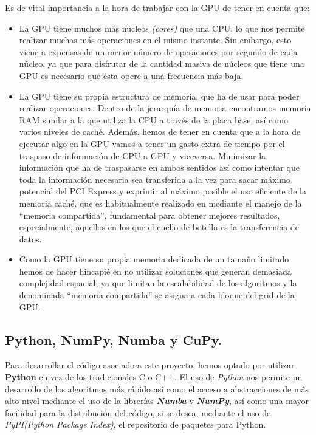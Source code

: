 Es de vital importancia a la hora de trabajar con la GPU de tener en cuenta que:\\
\begin{itemize}
    \item La GPU tiene muchos más núcleos \textit{(cores)} que una CPU, lo que nos permite realizar muchas más operaciones en el mismo instante. Sin embargo, esto viene a expensas de un menor número de operaciones por segundo de cada núcleo, ya que para disfrutar de la cantidad masiva de núcleos que tiene una GPU es necesario que ésta opere a una frecuencia más baja.

    \item La GPU tiene su propia estructura de memoria, que ha de usar para poder realizar operaciones. Dentro de la jerarquía de memoria encontramos memoria RAM similar a la que utiliza la CPU a través de la placa base, así como varios niveles de caché. Además, hemos de tener en cuenta que a la hora de ejecutar algo en la GPU vamos a tener un gasto extra de tiempo por el traspaso de información de CPU a GPU y viceversa. Minimizar la información que ha de traspasarse en ambos sentidos así como intentar que toda la información necesaria sea transferida a la vez para sacar máximo potencial del PCI Express y exprimir al máximo posible el uso eficiente de la memoria caché, que  es habitualmente realizado en \cuda mediante el manejo de la ``memoria compartida'', fundamental para obtener mejores resultados, especialmente, aquellos en los que el cuello de botella es la transferencia de datos.

    \item Como la GPU tiene su propia memoria dedicada de un tamaño limitado hemos de hacer hincapié en no utilizar soluciones que generan demasiada complejidad espacial, ya que limitan la escalabilidad de los algoritmos y la denominada ``memoria compartida'' se asigna a cada bloque del grid de la GPU.
\end{itemize}

\subsection{Python, NumPy, Numba y CuPy.}
Para desarrollar el código asociado a este proyecto, hemos optado por utilizar \textbf{Python} en vez de los tradicionales C o C++. El uso de \textit{Python} nos permite un desarrollo de los algoritmos más rápido así como el acceso a abstracciones de más alto nivel mediante el uso de la librerías \textbf{\textit{Numba}} y \textbf{\textit{NumPy}},  así como una mayor facilidad para la distribución del código, si se desea, mediante el uso de \textit{PyPI(Python Package Index)}, el repositorio de paquetes para Python. \\

